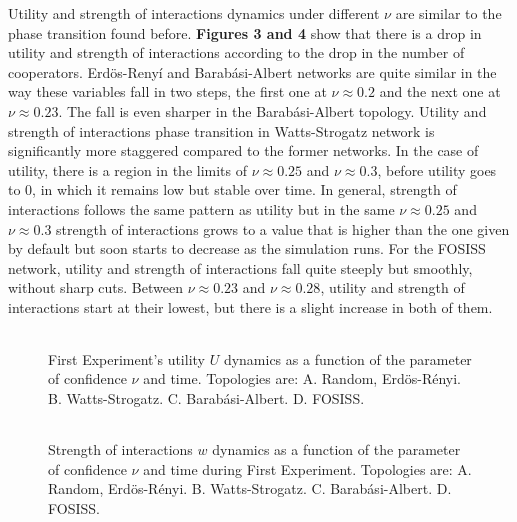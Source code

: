 \documentclass{bmcart}
\def\texttt{[image: ]}
\begin{document}
Utility and strength of interactions dynamics under different $\nu$ are
similar to the phase transition found before. \textbf{Figures 3 and 4}
show that there is a drop in utility and strength of interactions
according to the drop in the number of cooperators. Erd\"{o}s-Reny\'i
and Barab\'asi-Albert networks are quite similar in the way these
variables fall in two steps, the first one at $\nu \approx 0.2$ and
the next one at $\nu \approx 0.23$. The fall is even sharper in the
Barab\'asi-Albert topology. Utility and strength of interactions phase
transition in Watts-Strogatz network is significantly more staggered
compared to the former networks. In the case of utility, there is a
region in the limits of $\nu \approx 0.25$ and $\nu \approx 0.3$,
before utility goes to $0$, in which it remains low but stable over
time. In general, strength of interactions follows the same pattern as
utility but in the same $\nu \approx 0.25$ and $\nu \approx 0.3$
strength of interactions grows to a value that is higher than the one
given by default but soon starts to decrease as the simulation
runs. For the FOSISS network, utility and strength of interactions fall
quite steeply but smoothly, without sharp cuts. Between
$\nu \approx 0.23$ and $\nu \approx 0.28$, utility and strength of
interactions start at their lowest,
but there is a slight increase in both of them.\\


\begin{figure} [h!]
\centering
\begin{tabular}{cc}

\end{tabular}
\caption{First Experiment's utility $U$ dynamics as a function of the parameter
  of confidence $\nu$ and time. Topologies are: A. Random, Erd\"{o}s-R\'enyi. B. Watts-Strogatz. C. Barab\'asi-Albert. D. FOSISS.}\label{fitness}
\end{figure}



\begin{figure} [h!]
\centering
\begin{tabular}{cc}

\end{tabular}
\caption{Strength of interactions $w$ dynamics as a function of the parameter
  of confidence $\nu$ and time during First Experiment. Topologies are:
  A. Random, Erd\"{o}s-R\'enyi. B. Watts-Strogatz. C. Barab\'asi-Albert. D. FOSISS.}\label{trust}  
\end{figure} 
\end{document}
